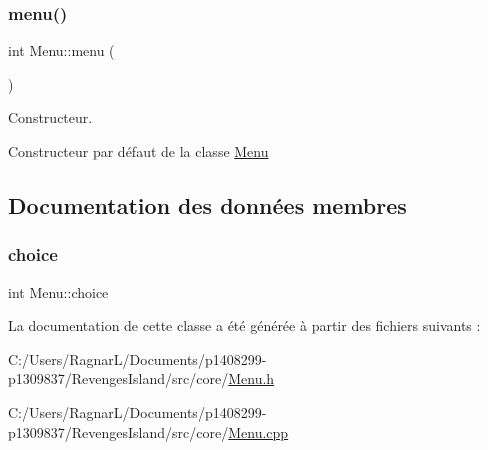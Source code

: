 \subsubsection{\texorpdfstring{menu()}{menu()}}
{\footnotesize\ttfamily int Menu\+::menu (\begin{DoxyParamCaption}{ }\end{DoxyParamCaption})}



Constructeur. 

Constructeur par défaut de la classe \hyperlink{class_menu}{Menu} 

\subsection{Documentation des données membres}
\mbox{\label{class_menu_ad5152b40c2819510f9e74600f4b510ad}} 
\subsubsection{\texorpdfstring{choice}{choice}}
{\footnotesize\ttfamily int Menu\+::choice\hspace{0.3cm}{\ttfamily [private]}}



La documentation de cette classe a été générée à partir des fichiers suivants \+:\begin{DoxyCompactItemize}
\item 
C\+:/\+Users/\+Ragnar\+L/\+Documents/p1408299-\/p1309837/\+Revenges\+Island/src/core/\hyperlink{_menu_8h}{Menu.\+h}\item 
C\+:/\+Users/\+Ragnar\+L/\+Documents/p1408299-\/p1309837/\+Revenges\+Island/src/core/\hyperlink{_menu_8cpp}{Menu.\+cpp}\end{DoxyCompactItemize}
